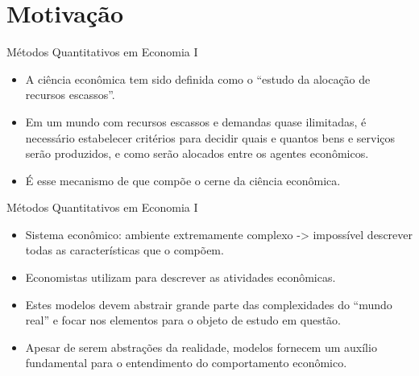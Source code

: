 \documentclass[10pt]{beamer}
\begin{document}
\section{Motivação}
\begin{frame}{Métodos Quantitativos em Economia I}
    \begin{itemize}
        \item A ciência econômica tem sido definida como o ``estudo da alocação de recursos escassos''.\bigskip

        \item Em um mundo com recursos escassos e demandas quase ilimitadas, é necessário estabelecer critérios para decidir quais e quantos bens e serviços serão produzidos, e como serão alocados entre os agentes econômicos.\bigskip

        \item É esse mecanismo de  que compõe o cerne da ciência econômica.
    \end{itemize}
\end{frame}

\begin{frame}{Métodos Quantitativos em Economia I}
    \begin{itemize}
        \item Sistema econômico: ambiente extremamente complexo -> impossível descrever todas as características que o compõem.\bigskip

        \item Economistas utilizam  para descrever as atividades econômicas.\bigskip

        \item Estes modelos devem abstrair grande parte das complexidades do ``mundo real'' e focar nos elementos  para o objeto de estudo em questão.\bigskip

        \item Apesar de serem abstrações da realidade, modelos fornecem um auxílio fundamental para o entendimento do comportamento econômico.
    \end{itemize}
\end{frame}
\end{document}
